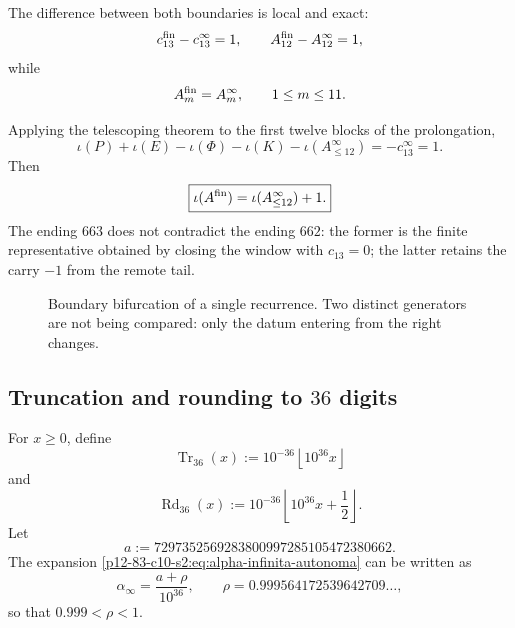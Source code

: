 The difference between both boundaries is local and exact:
\[
 c_{13}^{\rm fin}-c_{13}^{\infty}=1,
 \qquad
 A_{12}^{\rm fin}-A_{12}^{\infty}=1,
\]
while
\[
 A_m^{\rm fin}=A_m^\infty,
 \qquad 1\leq m\leq11.
\]

Applying the telescoping theorem to the first twelve blocks of the
prolongation,
\[
 \iota(P)+\iota(E)-\iota(\Phi)-\iota(K)
 -\iota(A^\infty_{\leq12})
 =-c_{13}^{\infty}=1.
\]
Then
\begin{equation}
 \boxed{
 \iota(A^{\rm fin})
 =\iota(A^\infty_{\leq12})+1.}
 \label{p12-83-c10-s2:eq:relacion-unidad-fronteras-alpha}
\end{equation}
The ending \(663\) does not contradict the ending \(662\): the former
is the finite representative obtained by closing the window with
\(c_{13}=0\); the latter retains the carry \(-1\) from the remote
tail.

\begin{figure}[htbp]
\centering
{}
\caption{Boundary bifurcation of a single recurrence. Two distinct generators
are not being compared: only the datum entering from the
right changes.}
\label{p12-83-c10-s2:fig:bifurcacion-frontera-alpha}
\end{figure}

\subsection{Truncation and rounding to \(36\) digits}

For \(x\geq0\), define
\[
 \operatorname{Tr}_{36}(x)
 :=10^{-36}\left\lfloor10^{36}x\right\rfloor
\]
and
\[
 \operatorname{Rd}_{36}(x)
 :=10^{-36}\left\lfloor10^{36}x+\frac12\right\rfloor.
\]
Let
\[
 a:=7297352569283800997285105472380662.
\]
The expansion \eqref{p12-83-c10-s2:eq:alpha-infinita-autonoma} can be written as
\[
 \alpha_\infty=\frac{a+\rho}{10^{36}},
 \qquad
 \rho=0.999564172539642709\ldots,
\]
so that \(0.999<\rho<1\).

